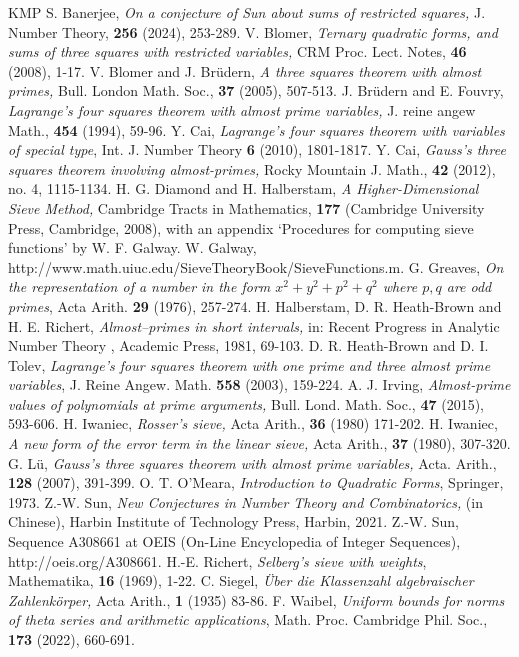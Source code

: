 \documentclass[12pt,a4paper,reqno]{amsart}
\numberwithin{equation}{section}
\theoremstyle{plain}
\theoremstyle{definition}
\begin{document}
\begin{thebibliography}{KMP}
 S. Banerjee, {\it On a conjecture of Sun about sums of restricted squares,} J. Number Theory,  {\bf256} (2024), 253-289.
 V. Blomer, {\it Ternary quadratic forms, and sums of three squares with restricted variables,} CRM Proc. Lect. Notes, {\bf46} (2008), 1-17.
 V. Blomer and J. Br\"udern, {\it A three squares theorem with almost primes,} Bull. London Math. Soc., {\bf37} (2005), 507-513.
 J. Br\"udern and E. Fouvry, {\it Lagrange's four squares theorem with almost prime variables,} J. reine angew Math., {\bf454} (1994), 59-96.
 Y. Cai, {\it Lagrange's four squares theorem with variables of special type}, Int. J. Number Theory {\bf6} (2010), 1801-1817.
 Y. Cai, {\it Gauss's three squares theorem involving almost-primes,} Rocky Mountain J. Math., {\bf 42} (2012), no. 4, 1115-1134.
 H. G. Diamond and H. Halberstam, {\it A Higher-Dimensional Sieve Method,} Cambridge Tracts in Mathematics, {\bf177} (Cambridge University Press, Cambridge, 2008), with an appendix `Procedures for computing sieve functions' by W. F. Galway.
 W. Galway, http://www.math.uiuc.edu/SieveTheoryBook/SieveFunctions.m.
 G. Greaves, {\it On the representation of a number in the form $x^2+y^2+p^2+q^2$ where $p,q$ are odd primes}, Acta Arith. {\bf29} (1976), 257-274.
 H. Halberstam, D. R. Heath-Brown and H. E. Richert, {\it Almost--primes in short intervals,} in: Recent Progress in Analytic Number Theory \uppercase\expandafter{}, Academic Press, 1981, 69-103.
 D. R. Heath-Brown and D. I. Tolev, {\it Lagrange's four squares theorem with one prime and three almost prime variables}, J. Reine Angew. Math. {\bf558} (2003), 159-224.
 A. J. Irving, {\it Almost-prime values of polynomials at prime arguments,} Bull. Lond. Math. Soc., {\bf47} (2015), 593-606.
 H. Iwaniec, {\it Rosser's sieve,} Acta Arith., {\bf36} (1980) 171-202.
 H. Iwaniec, {\it A new form of the error term in the linear sieve,} Acta Arith., {\bf37} (1980), 307-320.
 G. L\"u, {\it Gauss's three squares theorem with almost prime variables,} Acta. Arith., {\bf128} (2007), 391-399.
 O. T. O'Meara, {\it Introduction to Quadratic Forms}, Springer, 1973.
  Z.-W. Sun, {\it New Conjectures in Number Theory and Combinatorics,} (in Chinese), Harbin Institute
of Technology Press, Harbin, 2021.
 Z.-W. Sun, Sequence A308661 at OEIS (On-Line Encyclopedia of Integer Sequences), http://oeis.org/A308661.
 H.-E. Richert, {\it Selberg's sieve with weights}, Mathematika, {\bf16} (1969), 1-22.
 C. Siegel, {\it \"Uber die Klassenzahl algebraischer Zahlenk\"orper,} Acta Arith., {\bf1} (1935) 83-86.
 F. Waibel, {\it Uniform bounds for norms of theta series and arithmetic applications}, Math. Proc. Cambridge Phil. Soc., {\bf173} (2022), 660-691.
\end{thebibliography}
\end{document}
